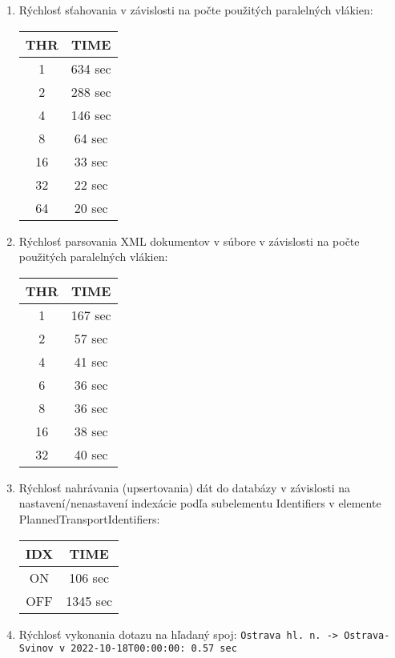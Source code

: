 \documentclass[10pt,xcolor=pdflatex,dvipsnames,table,oneside]{book}
\begin{document}
\begin{enumerate}
     
\item Rýchlosť sťahovania v závislosti na počte použitých paralelných vlákien:
\newline \newline
    \begin{tabular}{c|c}
        THR & TIME  \\
        \hline \hline
         1 & 634 sec \\
         2 & 288 sec \\
         4 & 146 sec \\
         8 & 64 sec \\
         16 & 33 sec \\
         32 & 22 sec \\
         64 & 20 sec \\
    \end{tabular}
\newline \newline 
\item  Rýchlosť parsovania XML dokumentov v súbore v závislosti na počte použitých paralelných vlákien:
\newline \newline
    \begin{tabular}{c|c}
        THR & TIME  \\
        \hline \hline
         1 & 167 sec \\
         2 & 57 sec \\
         4 & 41 sec \\
         6 & 36 sec \\
         8 & 36 sec \\
         16 & 38 sec \\
         32 & 40 sec \\
    \end{tabular}
\newpage

\item Rýchlosť nahrávania (upsertovania) dát do databázy v závislosti na nastavení/nenastavení indexácie podľa subelementu Identifiers v elemente PlannedTransportIdentifiers:
\newline \newline 
\begin{tabular}{c|c}
        IDX & TIME  \\
        \hline \hline
         ON & 106 sec \\
         OFF & 1345 sec \\
\end{tabular}
\newline \newline 
\item Rýchlosť vykonania dotazu na hľadaný spoj:
\newline \newline 
\verb|Ostrava hl. n. -> Ostrava-Svinov v 2022-10-18T00:00:00: 0.57 sec|
\end{enumerate}
\end{document}
